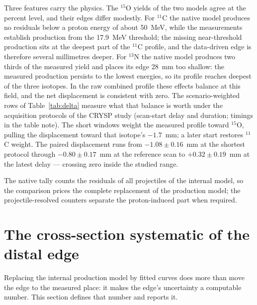 \documentclass[11pt]{article}
\newcommand{\generateddir}{docs/generated/sampling_xsections}
\newcommand{\generateddir}{generated/sampling_xsections}
\newcommand{\file}[1]{\texttt{#1}}
\begin{document}
\begin{table}[htbp]
\centering
\caption{Per-gray production yields and paired distal-edge displacements
$\Delta = R_{50}^{\mathrm{data}}-R_{50}^{\mathrm{G4}}$ for the standard
field.  Generated by
\file{analysis\_transport/xsections/sampling\_comparison.py}.}
\label{tab:delta}


\smallskip
{\footnotesize }
\end{table}

Three features carry the physics.  The $^{15}$O yields of the two models
agree at the percent level, and their edges differ modestly.  For $^{11}$C
the native model produces no residuals below a proton energy of about
\SI{50}{MeV}, while the measurements establish production from the
\SI{17.9}{MeV} threshold; the missing near-threshold production sits at the
deepest part of the $^{11}$C profile, and the data-driven edge is therefore
several millimetres deeper.  For $^{13}$N the native model produces two
thirds of the measured yield and places its edge \SI{28}{mm} too shallow:
the measured production persists to the lowest energies, so its profile
reaches deepest of the three isotopes.  In the raw combined profile these
effects balance at this field, and the net displacement is consistent with
zero.
The scenario-weighted rows of Table~\ref{tab:delta} measure what that
balance is worth under the acquisition protocols of the CRYSP study
(scan-start delay and duration; timings in the table note).  The short
windows weight the measured profile toward $^{15}$O, pulling the
displacement toward that isotope's $-1.7$~mm; a later start restores
$^{11}$C weight.  The paired displacement runs from $-1.08\pm0.16$~mm at
the shortest protocol through $-0.80\pm0.17$~mm at the reference scan to
$+0.32\pm0.19$~mm at the latest delay --- crossing zero inside the studied
range.

The native tally counts the residuals of all projectiles of the internal
model, so the comparison prices the complete replacement of the production
model; the projectile-resolved counters separate the proton-induced part
when required.

\section{The cross-section systematic of the distal edge}
\label{sec:systematic}

Replacing the internal production model by fitted curves does more than move
the edge to the measured place: it makes the edge's uncertainty a computable
number.  This section defines that number and reports it.
\end{document}
